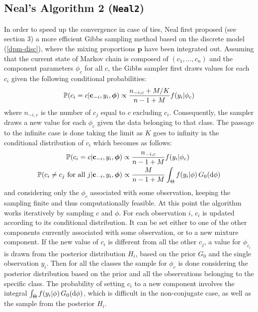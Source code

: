 \subsection{Neal's Algorithm 2 (\texttt{Neal2})}
In order to speed up the convergence in case of ties, Neal first proposed (see \cite{neal} section 3) a more efficient Gibbs sampling method based on the discrete model (\ref{dpm-disc}), where the mixing proportions $\textbf{p}$ have been integrated out.
Assuming that the current state of Markov chain is composed of $(c_1,\dots,c_n)$  and the component parameters $\phi_c$ for all $c$, the Gibbs sampler first draws values for each $c_i$ given the following conditional probabilities:
\begin{align}
	\mathbb P(c_{i}=c | \mathbf c_{-i}, y_{i},\boldsymbol\phi) \propto \frac{n_{-i,c} + M/{K}}{n-1+M} f(y_{i}|\phi_{c}) 
\end{align}
where $n_{-i,c}$ is the number of $c_j$ equal to $c$ excluding $c_i$.
Consequently, the sampler draws a new value for each $\phi_c$ given the data belonging to that class.
The passage to the infinite case is done taking the limit as $K$ goes to infinity in the conditional distribution of $c_i$ which becomes as follows:
\begin{equation}
	\begin{aligned}
	\mathbb P(c_{i}=c | \mathbf c_{-i}, y_{i},\boldsymbol\phi) &\propto \frac{n_{-i,c} }{n-1+M} f(y_{i}|\phi_{c}) \\
	\mathbb P(c_{i}\neq c_{j} \text{ for all } j | \mathbf c_{-i}, y_{i},\boldsymbol\phi) &\propto \frac{M }{n-1+M} \int_{\Theta} f(y_{i}|\phi) \, G_0(\mathrm d\phi) 
	\end{aligned}
\end{equation}
and considering only the $\phi_c$ associated with some observation, keeping the sampling finite and thus computationally feasible.
At this point the algorithm works iteratively by sampling $c$ and $\phi$.
For each observation $i$, $c_i$ is updated according to its conditional distribution.
It can be set either to one of the other components currently associated with some observation, or to a new mixture component.
If the new value of $c_i$ is different from all the other $c_j$, a value for $\phi_{c_i}$ is drawn from the posterior distribution $H_i$, based on the prior $G_0$ and the single observation $y_i$.
Then for all the classes the  sample for $\phi_c$ is done considering the posterior distribution based on the prior and all the observations belonging to the specific class.
The probability of setting $c_i$ to a new component involves the integral $\int_{\Theta} f(y_{i}|\phi) \, G_0(\mathrm d\phi)$, which is difficult in the non-conjugate case, as well as the sample from the posterior $H_i$.

